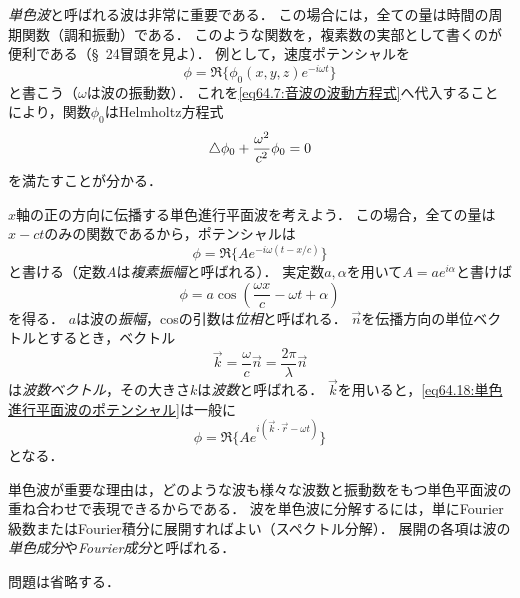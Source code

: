 \emph{単色波}と呼ばれる波は非常に重要である．
この場合には，全ての量は時間の周期関数（調和振動）である．
このような関数を，複素数の実部として書くのが便利である（\S~24冒頭を見よ）．
例として，速度ポテンシャルを
\begin{equation}
    \phi = \Re \{\phi_0(x,y,z)e^{-i\omega t}\}
\end{equation}
と書こう（$\omega$は波の振動数）．
これを\eqref{eq64.7:音波の波動方程式}へ代入することにより，関数$\phi_0$はHelmholtz方程式
\begin{equation}
    \triangle \phi_0 + \frac{\omega^2}{c^2}\phi_0 = 0
\end{equation}
を満たすことが分かる．


$x$軸の正の方向に伝播する単色進行平面波を考えよう．
この場合，全ての量は$x-ct$のみの関数であるから，ポテンシャルは
\begin{equation}\label{eq64.18:単色進行平面波のポテンシャル}
    \phi = \Re \{ A e^{-i\omega(t-x/c)} \}
\end{equation}
と書ける（定数$A$は\emph{複素振幅}と呼ばれる）．
実定数$a,\alpha$を用いて$A=ae^{i\alpha}$と書けば
\begin{equation}
    \phi = a \cos \left( \frac{\omega x}{c} - \omega t + \alpha \right)
\end{equation}
を得る．
$a$は波の\emph{振幅}，cosの引数は\emph{位相}と呼ばれる．
$\vec{n}$を伝播方向の単位ベクトルとするとき，ベクトル
\begin{equation}
    \vec{k} = \frac{\omega}{c}\vec{n} = \frac{2\pi}{\lambda} \vec{n}
\end{equation}
は\emph{波数ベクトル}，その大きさ$k$は\emph{波数}と呼ばれる．
$\vec{k}$を用いると，\eqref{eq64.18:単色進行平面波のポテンシャル}は一般に
\begin{equation}
    \phi = \Re \{ A e^{i(\vec{k}\cdot\vec{r}-\omega t)} \}
\end{equation}
となる．


単色波が重要な理由は，どのような波も様々な波数と振動数をもつ単色平面波の重ね合わせで表現できるからである．
波を単色波に分解するには，単にFourier級数またはFourier積分に展開すればよい（スペクトル分解）．
展開の各項は波の\emph{単色成分}や\emph{Fourier成分}と呼ばれる．





問題は省略する．

\BackToTheToc